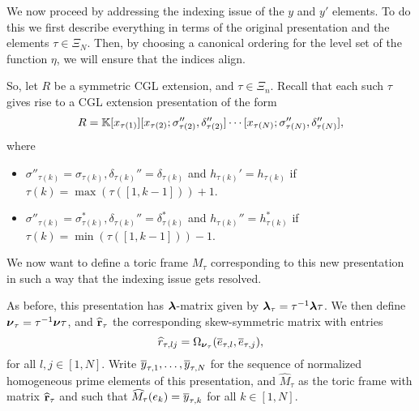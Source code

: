 We now proceed by addressing the indexing issue of the $y$ and $y'$ elements. To do
this we first describe everything in terms of the original presentation and the
elements $\tau \in \Xi_N$. Then, by choosing a canonical ordering for the level set of
the function $\eta$, we will ensure that the indices align.

So, let $R$ be a symmetric CGL extension, and $\tau \in \Xi_n$. Recall that each such
$\tau$ gives rise to a CGL extension presentation of the form
\begin{equation*}
	R = \mathbb{K}[x_{\tau(1)}][x_{\tau(2)}; \sigma_{\tau(2)}'', \delta_{\tau(2)}''] \cdots [x_{\tau(N)}; \sigma_{\tau(N)}'', \delta_{\tau(N)}''],
\end{equation*}
%
where
\begin{itemize}
	\item $\sigma''_{\tau(k)} = \sigma_{\tau(k)}, \delta_{\tau(k)}'' = \delta_{\tau(k)}$
	      and $h_{\tau(k)}' = h_{\tau(k)}$ if $\tau(k) = \max(\tau([1,k-1])) + 1$.
	\item $\sigma''_{\tau(k)} = \sigma^*_{\tau(k)}, \delta_{\tau(k)}'' = \delta^*_{\tau(k)}$ and
	      $h_{\tau(k)}'' = h_{\tau(k)}^*$ if $\tau(k) = \min(\tau([1,k-1])) - 1$.
\end{itemize}

We now want to define a toric frame $M_\tau$ corresponding to this new presentation in
such a way that the indexing issue gets resolved.

As before, this presentation has $\boldsymbol{\lambda}$-matrix given by $\boldsymbol{\lambda}_\tau = \tau^{-1} \boldsymbol{\lambda}
	\tau$. We then define $\boldsymbol{\nu}_\tau = \tau^{-1} \boldsymbol{\nu}
	\tau$, and $\widehat{\mathbf{r}}_\tau$ the corresponding skew-symmetric matrix with entries
\begin{equation*}
	\widehat{r}_{\tau, lj} = \Omega_{\boldsymbol{\nu}_\tau}(\overline{e}_{\tau, l}, \overline{e}_{\tau, j}),
\end{equation*}
%
for all $l, j \in [1, N]$.	Write $\overline{y}_{\tau, 1}, \dots, \overline{y}_{\tau, N}$ for the sequence of normalized homogeneous prime elements
of this presentation, and $\widehat{M}_\tau$ as the
toric frame with matrix $\widehat{\mathbf{r}}_\tau$ and such that $\widehat{M}_\tau (e_k) =
	\overline{y}_{\tau, k}$ for all $k \in [1, N]$.

